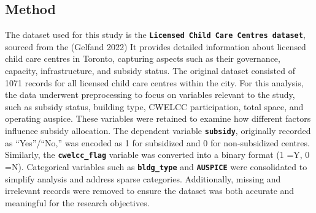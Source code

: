 \documentclass[
  letterpaper,
  DIV=11,
  numbers=noendperiod]{scrartcl}
\begin{document}
\subsection{Method}\label{method}

The dataset used for this study is the
\textbf{\texttt{Licensed\ Child\ Care\ Centres\ dataset}}, sourced from
the (Gelfand 2022) It provides detailed information about licensed child
care centres in Toronto, capturing aspects such as their governance,
capacity, infrastructure, and subsidy status. The original dataset
consisted of 1071 records for all licensed child care centres within the
city. For this analysis, the data underwent preprocessing to focus on
variables relevant to the study, such as subsidy status, building type,
CWELCC participation, total space, and operating auspice. These
variables were retained to examine how different factors influence
subsidy allocation. The dependent variable \textbf{\texttt{subsidy}},
originally recorded as ``Yes''/``No,'' was encoded as 1 for subsidized
and 0 for non-subsidized centres. Similarly, the
\textbf{\texttt{cwelcc\_flag}} variable was converted into a binary
format (1 =Y, 0 =N). Categorical variables such as
\textbf{\texttt{bldg\_type}} and \textbf{\texttt{AUSPICE}} were
consolidated to simplify analysis and address sparse categories.
Additionally, missing and irrelevant records were removed to ensure the
dataset was both accurate and meaningful for the research objectives.
\end{document}

